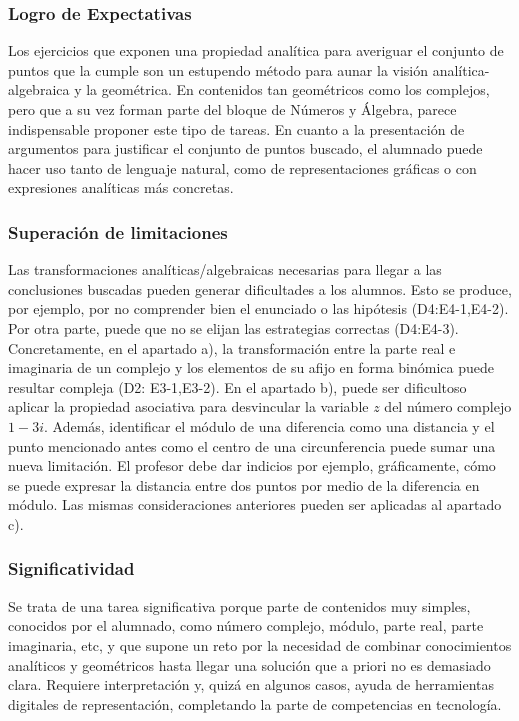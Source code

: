 \documentclass[../main.tex]{memoir}
\begin{document}
\subsubsection{Logro de Expectativas}
Los ejercicios que exponen una propiedad analítica para averiguar el conjunto de puntos que la cumple son un estupendo método para aunar la visión analítica-algebraica y la geométrica. En contenidos tan geométricos como los complejos, pero que a su vez forman parte del bloque de Números y Álgebra, parece indispensable proponer este tipo de tareas. En cuanto a la presentación de argumentos para justificar el conjunto de puntos buscado, el alumnado puede hacer uso tanto de lenguaje natural, como de representaciones gráficas o con expresiones analíticas más concretas.


\subsubsection{Superación de limitaciones}
Las transformaciones analíticas/algebraicas necesarias para llegar a las conclusiones buscadas pueden generar dificultades a los alumnos. Esto se produce, por ejemplo, por no comprender bien el enunciado o las hipótesis (D4:E4-1,E4-2). Por otra parte, puede que no se elijan las estrategias correctas (D4:E4-3). Concretamente, en el apartado a), la transformación entre la parte real e imaginaria de un complejo y los elementos de su afijo en forma binómica puede resultar compleja (D2: E3-1,E3-2). En el apartado b), puede ser dificultoso aplicar la propiedad asociativa para desvincular la variable $z$ del número complejo $1-3i$. Además, identificar el módulo de una diferencia como una distancia y el punto mencionado antes como el centro de una circunferencia puede sumar una nueva limitación. El profesor debe dar indicios por ejemplo, gráficamente, cómo se puede expresar la distancia entre dos puntos por medio de la diferencia en módulo. Las mismas consideraciones anteriores pueden ser aplicadas al apartado c).

\subsubsection{Significatividad}
Se trata de una tarea significativa porque parte de contenidos muy simples, conocidos por el alumnado, como número complejo, módulo, parte real, parte imaginaria, etc, y que supone un reto por la necesidad de combinar conocimientos analíticos y geométricos hasta llegar una solución que a priori no es demasiado clara. Requiere interpretación y, quizá en algunos casos, ayuda de herramientas digitales de representación, completando la parte de competencias en tecnología.
\end{document}
